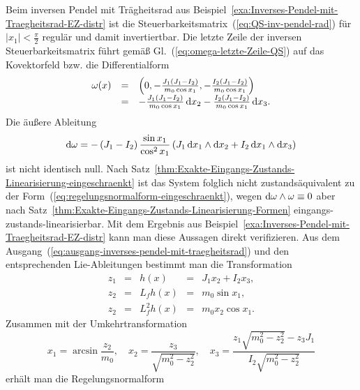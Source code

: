 \begin{example}
\label{exa:Inverses-Pendel-mit-Traegheitsrad-EZ-formen}Beim inversen
Pendel mit Trägheitsrad aus Beispiel~\ref{exa:Inverses-Pendel-mit-Traegheitsrad-EZ-distr}
ist die Steuerbarkeitsmatrix~(\ref{eq:QS-inv-pendel-rad}) für $|x_{1}|<\tfrac{\pi}{2}$
regulär und damit invertiertbar. Die letzte Zeile der inversen Steuerbarkeitsmatrix
führt gemäß Gl.~(\ref{eq:omega-letzte-Zeile-QS}) auf das Kovektorfeld
bzw. die Differentialform
\begin{equation}
\begin{array}{lcl}
\omega(x) & = & \left(0,-\frac{J_{1}(J_{1}-I_{2})}{m_{0}\cos x_{1}},-\frac{I_{2}(J_{1}-I_{2})}{m_{0}\cos x_{1}}\right)\\
 & = & -\frac{J_{1}(J_{1}-I_{2})}{m_{0}\cos x_{1}}\,{\mathrm{d}} x_{2}-\frac{I_{2}(J_{1}-I_{2})}{m_{0}\cos x_{1}}\,{\mathrm{d}} x_{3}.
\end{array}\label{eq:inv-pend-rad-omega}
\end{equation}
Die äußere Ableitung
\begin{equation}
{\mathrm{d}}\omega=-\left(J_{1}-I_{2}\right)\frac{\sin x_{1}}{\cos^{2}x_{1}}\left(J_{1}\,{\mathrm{d}} x_{1}\wedge{\mathrm{d}} x_{2}+I_{2}\,{\mathrm{d}} x_{1}\wedge{\mathrm{d}} x_{3}\right)\label{eq:inv-pend-rad-domega}
\end{equation}
ist nicht identisch null. Nach Satz~\ref{thm:Exakte-Eingangs-Zustands-Linearisierung-eingeschraenkt}
ist das System folglich nicht zustands\-äquivalent zu der Form~(\ref{eq:regelungsnormalform-eingeschraenkt}),
wegen ${\mathrm{d}}\omega\wedge\omega\equiv0$ aber nach Satz~\ref{thm:Exakte-Eingangs-Zustands-Linearisierung-Formen}
eingangs-zustands-linearisierbar. Mit dem Ergebnis aus Beispiel~\ref{exa:Inverses-Pendel-mit-Traegheitsrad-EZ-distr}
kann man diese Aussagen direkt verifizieren. Aus dem Ausgang~(\ref{eq:ausgang-inverses-pendel-mit-traegheitsrad})
und den entsprechenden Lie-Ableitungen bestimmt man die Transformation
\[
\begin{array}{lclcl}
z_{1} & = & h(x) & = & J_{1}x_{2}+I_{2}x_{3},\\
z_{2} & = & L_{f}h(x) & = & m_{0}\sin x_{1},\\
z_{2} & = & L_{f}^{2}h(x) & = & m_{0}x_{2}\cos x_{1}.
\end{array}
\]
Zusammen mit der Umkehrtransformation 
\[
x_{1}=\arcsin\frac{z_{2}}{m_{0}},\quad x_{2}=\frac{z_{3}}{\sqrt{m_{0}^{2}-z_{2}^{2}}},\quad x_{3}=\frac{z_{1}\sqrt{m_{0}^{2}-z_{2}^{2}}-z_{3}J_{1}}{I_{2}\sqrt{m_{0}^{2}-z_{2}^{2}}}
\]
erhält man die Regelungsnormalform
\[
\begin{array}{lcl}

\end{array}\]
\end{example}
